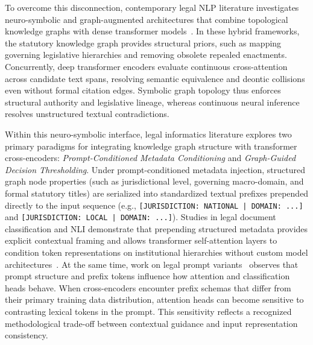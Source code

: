         To overcome this disconnection, contemporary legal NLP literature investigates neuro-symbolic and graph-augmented architectures that combine topological knowledge graphs with dense transformer models~\cite{li2024construction, ma2025gnn}. In these hybrid frameworks, the statutory knowledge graph provides structural priors, such as mapping governing legislative hierarchies and removing obsolete repealed enactments. Concurrently, deep transformer encoders evaluate continuous cross-attention across candidate text spans, resolving semantic equivalence and deontic collisions even without formal citation edges. Symbolic graph topology thus enforces structural authority and legislative lineage, whereas continuous neural inference resolves unstructured textual contradictions.

        Within this neuro-symbolic interface, legal informatics literature explores two primary paradigms for integrating knowledge graph structure with transformer cross-encoders: \textit{Prompt-Conditioned Metadata Conditioning} and \textit{Graph-Guided Decision Thresholding}. Under prompt-conditioned metadata injection, structured graph node properties (such as jurisdictional level, governing macro-domain, and formal statutory titles) are serialized into standardized textual prefixes prepended directly to the input sequence (e.g., \texttt{[JURISDICTION: NATIONAL | DOMAIN: ...]} and \texttt{[JURISDICTION: LOCAL | DOMAIN: ...]}). Studies in legal document classification and NLI demonstrate that prepending structured metadata provides explicit contextual framing and allows transformer self-attention layers to condition token representations on institutional hierarchies without custom model architectures~\cite{chalkidis2022lexglue, li2024construction}. At the same time, work on legal prompt variants~\cite{alshehri2026cross} observes that prompt structure and prefix tokens influence how attention and classification heads behave. When cross-encoders encounter prefix schemas that differ from their primary training data distribution, attention heads can become sensitive to contrasting lexical tokens in the prompt. This sensitivity reflects a recognized methodological trade-off between contextual guidance and input representation consistency.

